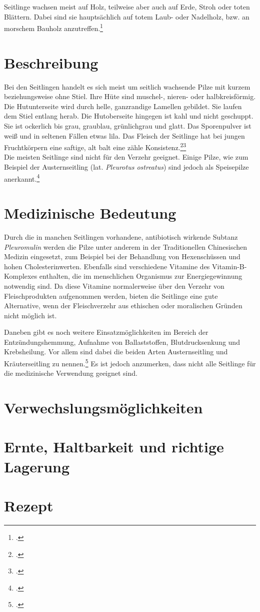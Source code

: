\documentclass[a4paper,abstracton]{scrreprt}
\begin{document}
Seitlinge wachsen meist auf Holz, teilweise aber auch auf Erde, Stroh oder toten Blättern. Dabei sind sie hauptsächlich auf totem Laub- oder Nadelholz, bzw. an morschem Bauholz anzutreffen.\footcite{pilzech}

\section{Beschreibung}
Bei den Seitlingen handelt es sich meist um seitlich wachsende Pilze mit kurzem beziehungsweise ohne Stiel. Ihre Hüte sind muschel-, nieren- oder halbkreisförmig. Die Hutunterseite wird durch helle, ganzrandige Lamellen gebildet. Sie laufen dem Stiel entlang herab. Die Hutoberseite hingegen ist kahl und nicht geschuppt. Sie ist ockerlich bis grau, graublau, grünlichgrau und glatt. Das Sporenpulver ist weiß und in seltenen Fällen etwas lila. Das Fleisch der Seitlinge hat bei jungen Fruchtkörpern eine saftige, alt balt eine zähle Konsistenz.\footcite{faktenuber}\footcite{pilzech}\\
Die meisten Seitlinge sind nicht für den Verzehr geeignet. Einige Pilze, wie zum Beispiel der Austernseitling (lat. \emph{Pleurotus ostreatus}) sind jedoch als Speisepilze anerkannt.\footcite{pg_austernseitling}

\section{Medizinische Bedeutung}
Durch die in manchen Seitlingen vorhandene, antibiotisch wirkende Subtanz \emph{Pleuromulin} werden die Pilze unter anderem in der Traditionellen Chinesischen Medizin eingesetzt, zum Beispiel bei der Behandlung von Hexenschüssen und hohen Cholesterinwerten. Ebenfalls sind verschiedene Vitamine des Vitamin-B-Komplexes enthalten, die im menschlichen Organismus zur Energiegewinnung notwendig sind. Da diese Vitamine normalerweise über den Verzehr von Fleischprodukten aufgenommen werden, bieten die Seitlinge eine gute Alternative, wenn der Fleischverzehr aus ethischen oder moralischen Gründen nicht möglich ist. 

Daneben gibt es noch weitere Einsatzmöglichkeiten im Bereich der Entzündungshemmung, Aufnahme von Ballaststoffen, Blutdrucksenkung und Krebsheilung.
Vor allem sind dabei die beiden Arten Austernseitling und Kräuterseitling zu nennen.\footcite{vital} Es ist jedoch anzumerken, dass nicht alle Seitlinge für die medizinische Verwendung geeignet sind.


\section{Verwechslungsmöglichkeiten}

\section{Ernte, Haltbarkeit und richtige Lagerung}

\section{Rezept}

\printbibliography[heading=lit]
\end{document}
